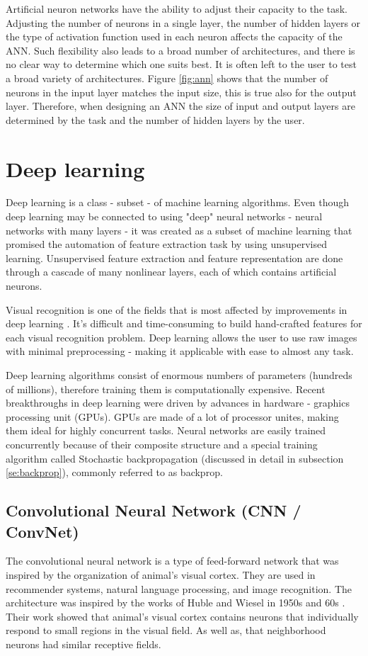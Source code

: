 \documentclass[times, utf8, diplomski]{fer}
\begin{document}
Artificial neuron networks have the ability to adjust their capacity to the task. Adjusting the number of neurons in a single layer, the number of hidden layers or the type of activation function used in each neuron affects the capacity of the ANN. Such flexibility also leads to a broad number of architectures, and there is no clear way to determine which one suits best. It is often left to the user to test a broad variety of architectures. Figure \ref{fig:ann} shows that the number of neurons in the input layer matches the input size, this is true also for the output layer. Therefore, when designing an ANN the size of input and output layers are determined by the task and the number of hidden layers by the user.


\section{Deep learning}
\label{se:deep_learning}
Deep learning is a class - subset - of machine learning algorithms. Even though deep learning may be connected to using "deep" neural networks - neural networks with many layers - it was created as a subset of machine learning that promised the automation of feature extraction task by using unsupervised learning. Unsupervised feature extraction and feature representation are done through a cascade of many nonlinear layers, each of which contains artificial neurons. 

Visual recognition is one of the fields that is most affected by improvements in deep learning \citep{krizhevsky_imagenet_2012, simonyan_very_2014, szegedy_going_2015, he_deep_2016}. It's difficult and time-consuming to build hand-crafted features for each visual recognition problem. Deep learning allows the user to use raw images with minimal preprocessing - making it applicable with ease to almost any task.

Deep learning algorithms consist of enormous numbers of parameters (hundreds of millions), therefore training them is computationally expensive. Recent breakthroughs in deep learning were driven by advances in hardware - graphics processing unit (GPUs). GPUs are made of a lot of processor unites, making them ideal for highly concurrent tasks. Neural networks are easily trained concurrently because of their composite structure and a special training algorithm called Stochastic backpropagation (discussed in detail in subsection \ref{se:backprop}), commonly referred to as backprop.

\subsection{Convolutional Neural Network (CNN /  ConvNet)}
The convolutional neural network is a type of feed-forward network that was inspired by the organization of animal's visual cortex. They are used in recommender systems, natural language processing, and image recognition. The architecture was inspired by the works of Huble and Wiesel in 1950s and 60s \citep{hubel_receptive_1968}. Their work showed that animal's visual cortex contains neurons that individually respond to small regions in the visual field. As well as,  that neighborhood neurons had similar receptive fields.
\end{document}
